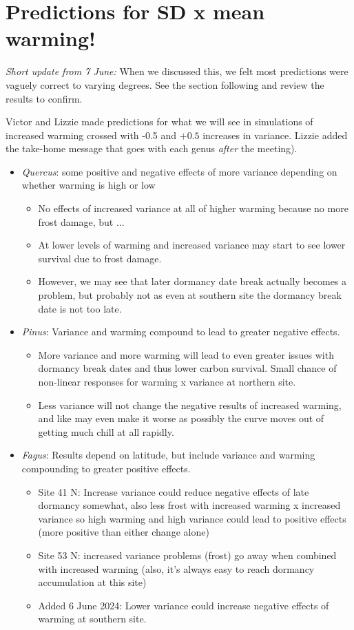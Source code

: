 \documentclass[11pt,letter]{article}
\begin{document}
\newpage

\section{Predictions for SD x mean warming!}

\emph{Short update from 7 June:} When we discussed this, we felt most predictions were vaguely correct to varying degrees. See the section following and review the results to confirm. 

Victor and Lizzie made predictions for what we will see in simulations of increased warming crossed with -0.5 and $+0.5$ increases in variance. Lizzie added the take-home message that goes with each genus \emph{after} the meeting). 

\begin{itemize}
\item \emph{Quercus}: some positive and negative effects of more variance depending on whether warming is high or low
\begin{itemize}
\item No effects of increased variance at all of higher warming because no more frost damage, but ...
\item At lower levels of warming and increased variance may start to see lower survival due to frost damage. 
\item However, we may see that later dormancy date break actually becomes a problem, but probably not as even at southern site the dormancy break date is not too late.
\end{itemize}
\item \emph{Pinus}: Variance and warming compound to lead to greater negative effects. 
\begin{itemize}
\item More variance and more warming will lead to even greater issues with dormancy break dates and thus lower carbon survival. Small chance of non-linear responses for warming x variance at northern site.
\item Less variance will not change the negative results of increased warming, and like may even make it worse as possibly the curve moves out of getting much chill at all rapidly. 
\end{itemize}
\item \emph{Fagus}: Results depend on latitude, but include variance and warming compounding to greater positive effects. 
\begin{itemize}
\item Site 41 N: Increase variance could reduce negative effects of late dormancy somewhat, also less frost with increased warming x increased variance so high warming and high variance could lead to positive effects (more positive than either change alone)
\item Site 53 N: increased variance problems (frost) go away when combined with increased warming (also, it's always easy to reach dormancy accumulation at this site)
\item Added 6 June 2024: Lower variance could increase negative effects of warming at southern site. 
\end{itemize}
\end{itemize}
\end{document}
